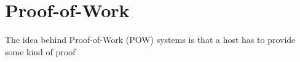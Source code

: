 \section{Proof-of-Work}

The idea behind Proof-of-Work (POW) systems is that a host has to provide some kind of proof 
